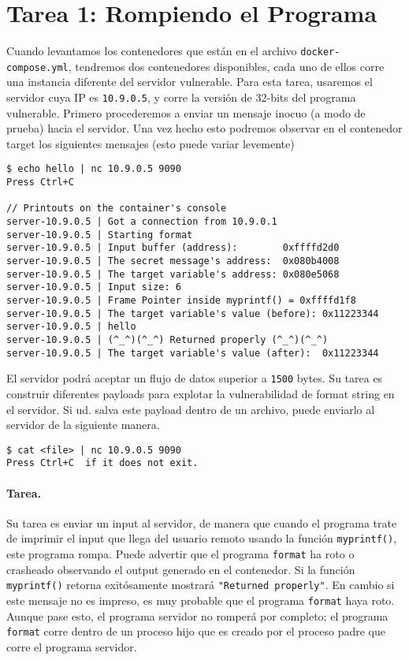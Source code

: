 \section{Tarea 1: Rompiendo el Programa}

Cuando levantamos los contenedores que están en el archivo \texttt{docker-compose.yml}, tendremos dos contenedores disponibles, cada uno de ellos corre una instancia diferente del servidor vulnerable.
Para esta tarea, usaremos el servidor cuya IP es \texttt{10.9.0.5}, y corre la versión de 32-bits del programa vulnerable.
Primero procederemos a enviar un mensaje inocuo (a modo de prueba) hacia el servidor.
Una vez hecho esto podremos observar en el contenedor target los siguientes mensajes (esto puede variar levemente)

\begin{lstlisting}
$ echo hello | nc 10.9.0.5 9090
Press Ctrl+C

// Printouts on the container's console
server-10.9.0.5 | Got a connection from 10.9.0.1
server-10.9.0.5 | Starting format
server-10.9.0.5 | Input buffer (address):        0xffffd2d0
server-10.9.0.5 | The secret message's address:  0x080b4008
server-10.9.0.5 | The target variable's address: 0x080e5068
server-10.9.0.5 | Input size: 6
server-10.9.0.5 | Frame Pointer inside myprintf() = 0xffffd1f8
server-10.9.0.5 | The target variable's value (before): 0x11223344
server-10.9.0.5 | hello
server-10.9.0.5 | (^_^)(^_^) Returned properly (^_^)(^_^)
server-10.9.0.5 | The target variable's value (after):  0x11223344
\end{lstlisting}
 
El servidor podrá aceptar un flujo de datos superior a \texttt{1500} bytes. Su tarea es construir diferentes payloads para explotar la vulnerabilidad de format string en el servidor. Si ud. salva este payload dentro de un archivo, puede enviarlo al servidor de la siguiente manera.

\begin{lstlisting}
$ cat <file> | nc 10.9.0.5 9090
Press Ctrl+C  if it does not exit.
\end{lstlisting}

\paragraph{Tarea.} Su tarea es enviar un input al servidor, de manera que cuando el programa trate de imprimir el input que llega del usuario remoto usando la función \texttt{myprintf()}, este programa rompa. Puede advertir que el programa  \texttt{format} ha roto o crasheado observando el output generado en el contenedor. Si la función \texttt{myprintf()} retorna exitósamente mostrará \texttt{"Returned properly"}. 
En cambio si este mensaje no es impreso, es muy probable que el programa \texttt{format} haya roto.
Aunque pase esto, el programa servidor no romperá por completo; el programa \texttt{format} corre dentro de un proceso hijo que es creado por el proceso padre que corre el programa servidor.


